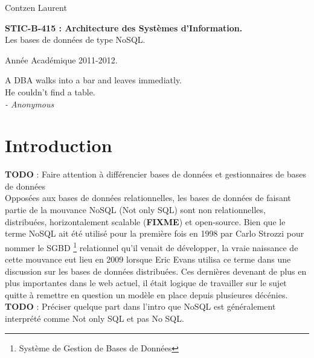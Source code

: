 \documentclass[11pt]{article}
\author{Contzen Laurent}
\begin{document}
\begin{titlepage}  
  \begin{flushleft}
    Contzen Laurent
  \end{flushleft}
  \begin{center}
    \vspace{85mm}\LARGE{\textbf{STIC-B-415 : Architecture des Systèmes d'Information.} \\    
      Les bases de données de type NoSQL.}
  \end{center}
  \begin{flushright}
    \vspace{95mm}
    Année Académique 2011-2012.             
  \end{flushright}
\end{titlepage}

\vspace*{\fill}
\begin{flushright}
  A DBA walks into a bar and leaves immediatly. \\
  He couldn't find a table. \\
  \textit{- Anonymous}
\end{flushright}
\vspace*{\fill}
\newpage
\tableofcontents
\newpage


\section{Introduction}
\colorbox{BrickRed}{\textbf{TODO} : Faire attention à différencier bases de données et gestionnaires de bases de données} \\
Opposées aux bases de données relationnelles, les bases de données de faisant partie de la mouvance NoSQL (Not only SQL) sont non relationnelles, distribuées, horizontalement scalable (\colorbox{BrickRed}{\textbf{FIXME}}) et open-source. Bien que le terme NoSQL ait été utilisé pour la première fois en 1998 par Carlo Strozzi pour nommer le SGBD \footnote{Système de Gestion de Bases de Données} relationnel qu'il venait de développer, la vraie naissance de cette mouvance eut lieu en 2009 lorsque Eric Evans utilisa ce terme dans une discussion sur les bases de données distribuées. Ces dernières devenant de plus en plus importantes dans le web actuel, il était logique de travailler sur le sujet quitte à remettre en question un modèle en place depuis plusieures décénies. \colorbox{BrickRed}{\textbf{TODO} : Préciser quelque part dans l'intro que NoSQL est généralement interprété comme} \colorbox{BrickRed}{Not only SQL et pas No SQL.}
\end{document}
